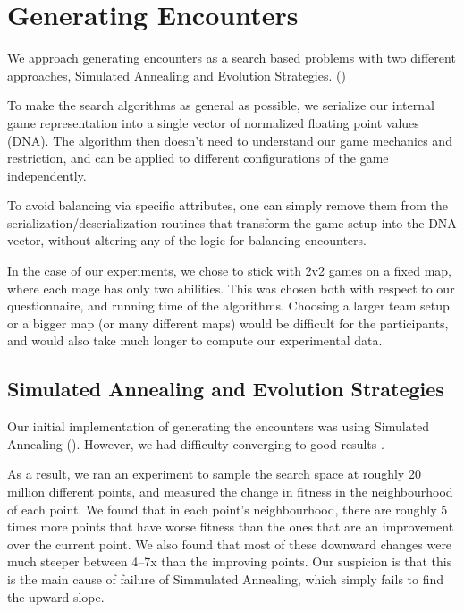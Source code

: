 \chapter{Generating Encounters}

We approach generating encounters as a search based problems with two
different approaches, Simulated Annealing and Evolution Strategies. ()

To make the search algorithms as general as possible, we serialize our
internal game representation into a single vector of normalized floating
point values (DNA). The algorithm then doesn't need to understand our game
mechanics and restriction, and can be applied to different configurations of
the game independently.

To avoid balancing via specific attributes, one can simply remove them from
the serialization/deserialization routines that transform the game setup into
the DNA vector, without altering any of the logic for balancing encounters.

In the case of our experiments, we chose to stick with 2v2 games on a fixed map,
where each mage has only two abilities. This was chosen both with respect to our
questionnaire, and running time of the algorithms. Choosing a larger team setup or
a bigger map (or many different maps) would be difficult for the participants,
and would also take much longer to compute our experimental data.



\section{Simulated Annealing and Evolution Strategies}

Our initial implementation of generating the encounters was using Simulated
Annealing (). However, we had difficulty converging to good
results .

As a result, we ran an experiment to sample the search space at roughly 20
million different points, and measured the change in fitness in the
neighbourhood of each point. We found that in each point's neighbourhood,
there are roughly 5 times more points that have worse fitness than the ones
that are an improvement over the current point. We also found that most of
these downward changes were much steeper between 4--7x than the improving
points. Our suspicion is that this is the main cause of failure of
Simmulated Annealing, which simply fails to find the upward slope.

